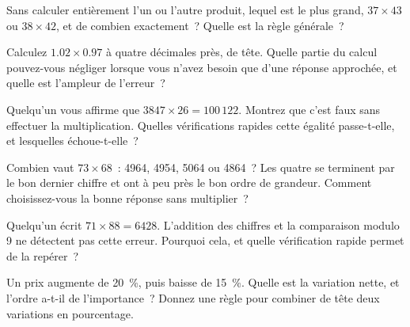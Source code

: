 \begin{question}\label{iq:iv1:mental-technique:19}
Sans calculer entièrement l'un ou l'autre produit, lequel est le plus grand, $37 \times 43$ ou $38 \times 42$, et de combien exactement~? Quelle est la règle générale~?
\end{question}

\begin{question}\label{iq:iv1:mental-technique:20}
Calculez $1.02 \times 0.97$ à quatre décimales près, de tête. Quelle partie du calcul pouvez-vous négliger lorsque vous n'avez besoin que d'une réponse approchée, et quelle est l'ampleur de l'erreur~?
\end{question}

\begin{question}\label{iq:iv1:mental-technique:21}
Quelqu'un vous affirme que $3847 \times 26 = 100\,122$. Montrez que c'est faux sans effectuer la multiplication. Quelles vérifications rapides cette égalité passe-t-elle, et lesquelles échoue-t-elle~?
\end{question}

\begin{question}\label{iq:iv1:mental-technique:22}
Combien vaut $73 \times 68$~: 4964, 4954, 5064 ou 4864~? Les quatre se terminent par le bon dernier chiffre et ont à peu près le bon ordre de grandeur. Comment choisissez-vous la bonne réponse sans multiplier~?
\end{question}

\begin{question}\label{iq:iv1:mental-technique:23}
Quelqu'un écrit $71 \times 88 = 6428$. L'addition des chiffres et la comparaison modulo 9 ne détectent pas cette erreur. Pourquoi cela, et quelle vérification rapide permet de la repérer~?
\end{question}

\begin{question}\label{iq:iv1:mental-technique:24}
Un prix augmente de 20~\%, puis baisse de 15~\%. Quelle est la variation nette, et l'ordre a-t-il de l'importance~? Donnez une règle pour combiner de tête deux variations en pourcentage.
\end{question}

